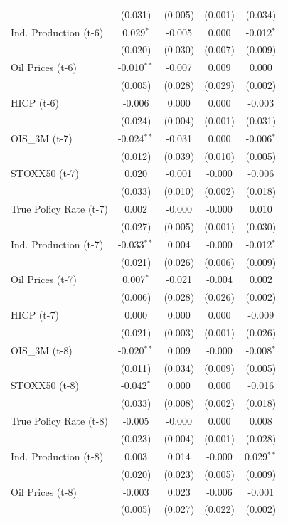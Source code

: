 \begin{longtable}[t]{lcccc}
 & (0.031) & (0.005) & (0.001) & (0.034)\\
Ind. Production (t-6) & 0.029$^{*}$ & -0.005 & 0.000 & -0.012$^{*}$\\
 & (0.020) & (0.030) & (0.007) & (0.009)\\
Oil Prices (t-6) & -0.010$^{**}$ & -0.007 & 0.009 & 0.000\\
 & (0.005) & (0.028) & (0.029) & (0.002)\\
HICP (t-6) & -0.006 & 0.000 & 0.000 & -0.003\\
 & (0.024) & (0.004) & (0.001) & (0.031)\\
OIS\_3M (t-7) & -0.024$^{**}$ & -0.031 & 0.000 & -0.006$^{*}$\\
 & (0.012) & (0.039) & (0.010) & (0.005)\\
STOXX50 (t-7) & 0.020 & -0.001 & -0.000 & -0.006\\
 & (0.033) & (0.010) & (0.002) & (0.018)\\
True Policy Rate (t-7) & 0.002 & -0.000 & -0.000 & 0.010\\
 & (0.027) & (0.005) & (0.001) & (0.030)\\
Ind. Production (t-7) & -0.033$^{**}$ & 0.004 & -0.000 & -0.012$^{*}$\\
 & (0.021) & (0.026) & (0.006) & (0.009)\\
Oil Prices (t-7) & 0.007$^{*}$ & -0.021 & -0.004 & 0.002\\
 & (0.006) & (0.028) & (0.026) & (0.002)\\
HICP (t-7) & 0.000 & 0.000 & 0.000 & -0.009\\
 & (0.021) & (0.003) & (0.001) & (0.026)\\
OIS\_3M (t-8) & -0.020$^{**}$ & 0.009 & -0.000 & -0.008$^{*}$\\
 & (0.011) & (0.034) & (0.009) & (0.005)\\
STOXX50 (t-8) & -0.042$^{*}$ & 0.000 & 0.000 & -0.016\\
 & (0.033) & (0.008) & (0.002) & (0.018)\\
True Policy Rate (t-8) & -0.005 & -0.000 & 0.000 & 0.008\\
 & (0.023) & (0.004) & (0.001) & (0.028)\\
Ind. Production (t-8) & 0.003 & 0.014 & -0.000 & 0.029$^{**}$\\
 & (0.020) & (0.023) & (0.005) & (0.009)\\
Oil Prices (t-8) & -0.003 & 0.023 & -0.006 & -0.001\\
 & (0.005) & (0.027) & (0.022) & (0.002)\\

\end{longtable}
